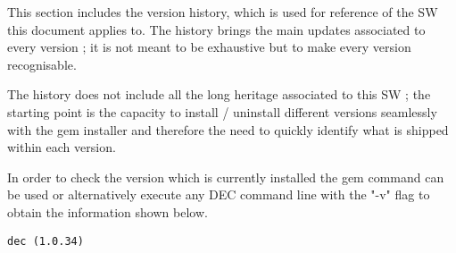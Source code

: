 \documentclass[dec_sum_main.tex]{subfiles}
\begin{document}
 
\par
\noindent
This section includes the version history, which is used for reference of the SW this document applies to. The history brings the main updates associated to every version ; it is not meant to be exhaustive but to make every version recognisable.\newline

\par
\noindent
The history does not include all the long heritage associated to this SW ; the starting point is the capacity to install / uninstall different versions seamlessly with the gem installer and therefore the need to quickly identify what is shipped within each version. \newline

\par
\noindent 
In order to check the version which is currently installed the gem command can be used or alternatively execute any DEC command line with the "-v" flag to obtain the information shown below. \newline


\begin{Verbatim}[tabsize=4]
    dec (1.0.34)
\end{Verbatim}

\end{document}
